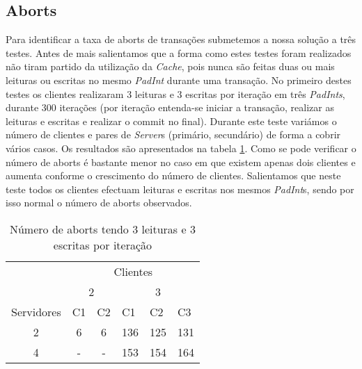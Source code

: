 \subsection{Aborts}
Para identificar a taxa de aborts de transações submetemos a nossa solução a três testes. Antes de mais salientamos que a forma como estes testes foram realizados não tiram partido da utilização da \textit{Cache}, pois nunca são feitas duas ou mais leituras ou escritas no mesmo \textit{PadInt} durante uma transação. No primeiro destes testes os clientes realizaram 3 leituras e 3 escritas por iteração em três \textit{PadInts}, durante 300 iterações (por iteração entenda-se iniciar a transação, realizar as leituras e escritas e realizar o commit no final). Durante este teste variámos o número de clientes e pares de \textit{Server}s (primário, secundário) de forma a cobrir vários casos. Os resultados são apresentados na tabela \ref{figAAborts}. Como se pode verificar o número de aborts é bastante menor no caso em que existem apenas dois clientes e aumenta conforme o crescimento do número de clientes. Salientamos que neste teste todos os clientes efectuam leituras e escritas nos mesmos \textit{PadInt}s, sendo por isso normal o número de aborts observados.

\begin{table}[h]
\centering
\begin{tabular}{l|c|c|c|c|c|}
\cline{2-6}
                                 & \multicolumn{5}{c|}{Clientes}                                                                                                   \\ \cline{2-6} 
                                 & \multicolumn{2}{c|}{2}                            & \multicolumn{3}{c|}{3}                                                      \\ \hline
\multicolumn{1}{|l|}{Servidores} & \multicolumn{1}{l|}{C1} & \multicolumn{1}{l|}{C2} & \multicolumn{1}{l|}{C1} & \multicolumn{1}{l|}{C2} & \multicolumn{1}{l|}{C3} \\ \hline
\multicolumn{1}{|c|}{2}          & 6                       & 6                       & 136                     & 125                     & 131                     \\ \hline
\multicolumn{1}{|c|}{4}          & -                       & -                       & 153                     & 154                     & 164                     \\ \hline
\end{tabular}
\caption{Número de aborts tendo 3 leituras e 3 escritas por iteração} \label{figAAborts}
\end{table}

